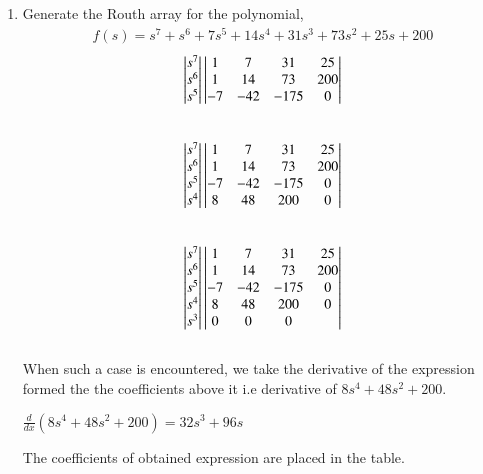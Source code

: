 \begin{enumerate}[label=\thesubsection.\arabic*.,ref=\thesubsection.\theenumi]

\item Generate the Routh array for the 
polynomial, 
\begin{align}
f(s)=s^{7}+s^{6}+7 s^{5}+14 s^{4}+31s^{3}+73 s^{2}+25 s+ 200
\label{eq:ee18btech11014_routh_poly}
\end{align}
\solution 
\begin{align}
\begin{vmatrix}s^7\\s^6\\s^5\end{vmatrix}
\begin{vmatrix}1 & 7 & 31 & 25 \\ 1 & 14 & 73 & 200 \\ -7 & -42 & -175 & 0\end{vmatrix}
\end{align}\\
\begin{align}
\begin{vmatrix}s^7\\s^6\\s^5\\s^4\end{vmatrix}
\begin{vmatrix}1 & 7 & 31 & 25 \\ 1 & 14 & 73 & 200 \\ -7 & -42 & -175 & 0 \\ 8 & 48 & 200 & 0\end{vmatrix}
\end{align}\\
\begin{align}
\begin{vmatrix}s^7\\s^6\\s^5\\s^4\\s^3\end{vmatrix}
\begin{vmatrix}1 & 7 & 31 & 25 \\ 1 & 14 & 73 & 200 \\ -7 & -42 & -175 & 0 \\ 8 & 48 & 200 & 0 \\ 0 & 0 & 0 &  \end{vmatrix}
\end{align}\\

When such a case is encountered, we take the derivative of the expression formed the the coefficients above it i.e derivative of $8s^4 + 48s^2 +200$.
\begin{center}
    $\frac{d}{dx}(8s^4 + 48s^2 +200) = 32s^3 + 96s$
\end{center}

The coefficients of obtained expression are placed in the table.


\end{enumerate}
